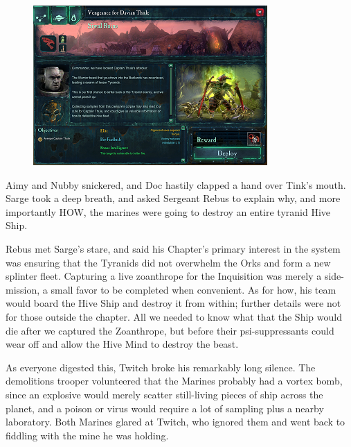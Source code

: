 \begin{figure}
	\begin{center}
		\includegraphics[width=\figwidth]{pics/12/21.png}
	\end{center}
\end{figure}
Aimy and Nubby snickered, and Doc hastily clapped a hand over Tink's mouth. 
Sarge took a deep breath, and asked Sergeant Rebus to explain why, and more importantly HOW, the marines were going to destroy an entire tyranid Hive Ship.

Rebus met Sarge's stare, and said his Chapter's primary interest in the system was ensuring that the Tyranids did not overwhelm the Orks and form a new splinter fleet. 
Capturing a live zoanthrope for the Inquisition was merely a side-mission, a small favor to be completed when convenient. 
As for how, his team would board the Hive Ship and destroy it from within; 
further details were not for those outside the chapter. 
All we needed to know what that the Ship would die after we captured the Zoanthrope, but before their psi-suppressants could wear off and allow the Hive Mind to destroy the beast.

As everyone digested this, Twitch broke his remarkably long silence. 
The demolitions trooper volunteered that the Marines probably had a vortex bomb, since an explosive would merely scatter still-living pieces of ship across the planet, and a poison or virus would require a lot of sampling plus a nearby laboratory. 
Both Marines glared at Twitch, who ignored them and went back to fiddling with the mine he was holding.

